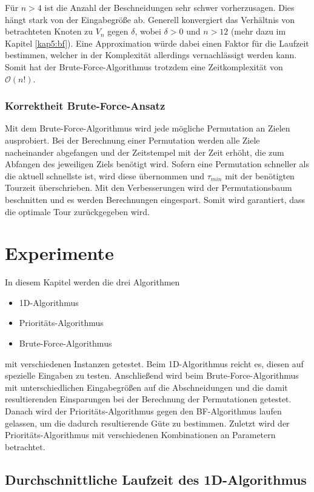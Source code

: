\documentclass[german,version-2019-11]{uzl-thesis}
\begin{document}
Für $n>4$ ist die Anzahl der Beschneidungen sehr schwer vorherzusagen. Dies hängt stark von der Eingabegröße ab. Generell konvergiert das Verhältnis von betrachteten Knoten zu $V_n$ gegen $\delta$, wobei $\delta>0$ und $n>12$ (mehr dazu im Kapitel \ref{kap5:bf}). Eine Approximation würde dabei einen Faktor für die Laufzeit bestimmen, welcher in der Komplexität allerdings vernachlässigt werden kann. Somit hat der Brute-Force-Algorithmus trotzdem eine Zeitkomplexität von $\mathcal{O}(n!)$.

\subsection{Korrektheit Brute-Force-Ansatz}
Mit dem Brute-Force-Algorithmus wird jede mögliche Permutation an Zielen ausprobiert. Bei der Berechnung einer Permutation werden alle Ziele nacheinander abgefangen und der Zeitstempel mit der Zeit erhöht, die zum Abfangen des jeweiligen Ziels benötigt wird. Sofern eine Permutation schneller als die aktuell schnellste ist, wird diese übernommen und $\tau_{min}$ mit der benötigten Tourzeit überschrieben. Mit den Verbesserungen wird der Permutationsbaum beschnitten und es werden Berechnungen eingespart. Somit wird garantiert, dass die optimale Tour zurückgegeben wird.


\chapter{Experimente}
\label{kap5}
In diesem Kapitel werden die drei Algorithmen
\begin{itemize}
\item 1D-Algorithmus
\item Prioritäts-Algorithmus
\item Brute-Force-Algorithmus
\end{itemize}
mit verschiedenen Instanzen getestet. Beim 1D-Algorithmus reicht es, diesen auf spezielle Eingaben zu testen. Anschließend wird beim Brute-Force-Algorithmus mit unterschiedlichen Eingabegrößen auf die Abschneidungen und die damit resultierenden Einsparungen bei der Berechnung der Permutationen getestet. Danach wird der Prioritäts-Algorithmus gegen den BF-Algorithmus laufen gelassen, um die dadurch resultierende Güte zu bestimmen. Zuletzt wird der Prioritäts-Algorithmus mit verschiedenen Kombinationen an Parametern betrachtet. 

\section{Durchschnittliche Laufzeit des 1D-Algorithmus}
\end{document}
